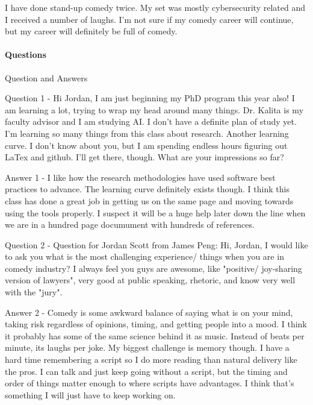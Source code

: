	I have done stand-up comedy twice. My set was mostly cybersecurity related and I received a number of laughs. I'm not sure if my comedy career will continue, but my career will definitely be full of comedy. 
	

	
	
	
	\paragraph*{\textbf{Questions}}
	
	Question and Answers
	
	
	Question 1 - Hi Jordan, I am just beginning my PhD program this year also!  I am learning a lot, trying to wrap my head around many things.  Dr. Kalita is my faculty advisor and I am studying AI.  I don't have a definite plan of study yet.  I'm learning so many things from this class about research. Another learning curve.  I don't know about you, but I am spending endless hours figuring out LaTex and github. I'll get there, though.  What are your impressions so far?
	
	
	Answer 1 - I like how the research methodologies have used software best practices to advance. The learning curve definitely exists though. I think this class has done a great job in getting us on the same page and moving towards using the tools properly. I suspect it will be a huge help later down the line when we are in a hundred page documument with hundreds of references.

	
	Question 2 - Question for Jordan Scott from James Peng: Hi, Jordan, I would like to ask you what is the most challenging experience/ things when you are  in comedy industry? I always feel you guys are awesome, like "positive/ joy-sharing version of lawyers", very good at public speaking, rhetoric, and know very well with the "jury".
	
	
	Answer 2 - Comedy is some awkward balance of saying what is on your mind, taking risk regardless of opinions, timing, and getting people into a mood. I think it probably has some of the same science behind it as music. Instead of beats per minute, its laughs per joke. My biggest challenge is memory though. I have a hard time remembering a script so I do more reading than natural delivery like the pros. I can talk and just keep going without a script, but the timing and order of things matter enough to where scripts have advantages. I think that's something I will just have to keep working on.


